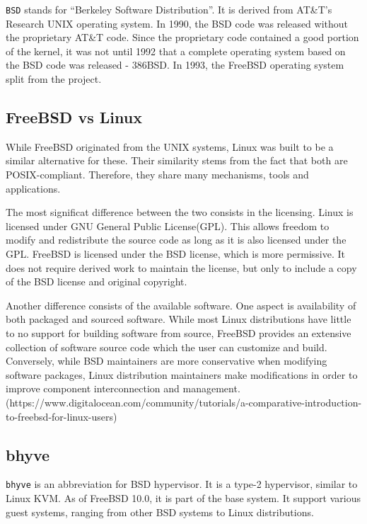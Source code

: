 
\texttt{BSD} stands for “Berkeley Software Distribution”. It is derived from AT\&T's Research UNIX operating system. In 1990, the BSD code was released without the proprietary AT\&T code.
Since the proprietary code contained a good portion of the kernel, it was not until 1992 that a complete operating system based on the BSD code was released - 386BSD. In 1993, the FreeBSD operating system split from the project. 

\subsection{FreeBSD vs Linux}
\label{subsec:bsdlinux}

While FreeBSD originated from the UNIX systems, Linux was built to be a similar alternative for these. Their similarity stems from the fact that both are POSIX-compliant. Therefore, they share many mechanisms, tools and applications.

The most significat difference between the two consists in the licensing. Linux is licensed under GNU General Public License(GPL). This allows freedom to modify and redistribute the source code as long as it is also licensed under the GPL. FreeBSD is licensed under the BSD license, which is more permissive. It does not require derived work to maintain the license, but only to include a copy of the BSD license and original copyright.

Another difference consists of the available software. One aspect is availability of both packaged and sourced software. While most Linux distributions have little to no support for building software from source, FreeBSD provides an extensive collection of software source code which the user can customize and build. Conversely, while BSD maintainers are more conservative when modifying software packages, Linux distribution maintainers make modifications in order to improve component interconnection and management.
(https://www.digitalocean.com/community/tutorials/a-comparative-introduction-to-freebsd-for-linux-users)

\subsection{bhyve}
\label{subsec:bhyve}

\texttt{bhyve} is an abbreviation for BSD hypervisor. It is a type-2 hypervisor, similar to Linux KVM. As of FreeBSD 10.0, it is part of the base system. It support various guest systems, ranging from other BSD systems to Linux distributions.

